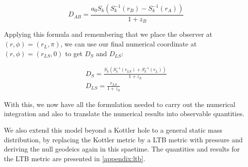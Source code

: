 \begin{equation}
  D_{AB} = \frac{a_0  S_k(S_k^{-1}(r_B) - S_k^{-1}(r_A))}{1+z_B}
\end{equation}

Applying this formula and remembering that we place the observer at $(r, \phi) = (r_L, \pi)$, we can use our final numerical coordinate at $(r, \phi) = (r_{LS}, 0)$ to get $D_S$ and $D_{LS}$:

\begin{subequations}
  \begin{gather}
    D_{S} = \frac{S_k(S_k^{-1}(r_{LS}) + S_k^{-1}(r_L))}{1+z_S}\\
    D_{LS} = \frac{r_{LS}}{1+z_S}
  \end{gather}
\end{subequations}

With this, we now have all the formulation needed to carry out the numerical integration and also to translate the numerical results into observable quantities. 

We also extend this model beyond a Kottler hole to a general static mass distribution, by replacing the Kottler metric by a LTB metric with pressure and deriving the null geodeics again in this spaetime. The quantities and results for the LTB metric are presented in \autoref{appendix:ltb}.